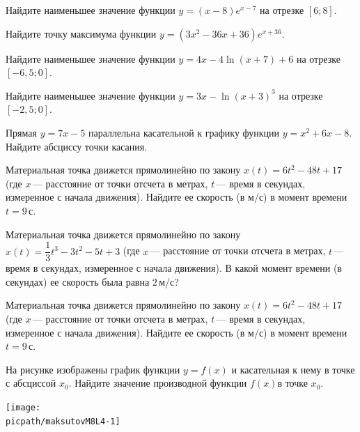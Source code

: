 \begin{consultation}
\begin{listofex}
		\item Найдите наименьшее значение функции \(y=(x-8)e^{x-7}\) на отрезке \([6;8]\).
		\item Найдите точку максимума функции \( y=(3x^2-36x+36)e^{x+36}. \)
		\item Найдите наименьшее значение функции \(y=4x-4\ln(x+7)+6\) на отрезке \([-6,5; 0]\).
		\item Найдите наименьшее значение функции \(y=3x-\ln(x+3)^3\) на отрезке \([-2,5; 0]\).
		\item Прямая \(y=7x-5\) параллельна касательной к графику функции \(y=x^2+6x-8\). Найдите абсциссу точки касания.
		\item Материальная точка движется прямолинейно по закону \(x(t)=6t^2-48t+17\) (где \(x\) --- расстояние от точки отсчета в метрах, \(t\) --- время в секундах, измеренное с начала движения). Найдите ее скорость (в м/с) в момент времени \(t  =  9\) с.
		\item Материальная точка движется прямолинейно по закону \(x(t)=\dfrac{ 1 }{ 3 }t^3-3t^2-5t+3\) (где \(x\) --- расстояние от точки отсчета в метрах, \(t\) --- время в секундах, измеренное с начала движения). В какой момент времени (в секундах) ее скорость была равна \(2\) м/с?
		\item Материальная точка движется прямолинейно по закону \( x(t)=6t^2-48t+17 \) (где \(x\) --- расстояние от точки отсчета в метрах, \(t\) --- время в секундах, измеренное с начала движения). Найдите ее скорость (в м/с) в момент времени \(t  =  9\) с.
		\item
		\begin{minipage}[t]{\bodywidth}
			На рисунке изображены график функции \(y=f(x)\) и касательная к нему в точке с абсциссой \(x_0\). Найдите значение производной функции \(f(x)\)в точке \(x_0\).
		\end{minipage}
		\hspace{0.02\linewidth}
		\begin{minipage}[t]{\picwidth}
			\texttt{[image: \\picpath/maksutovM8L4-1]}

\end{minipage}
\end{listofex}
\end{consultation}
